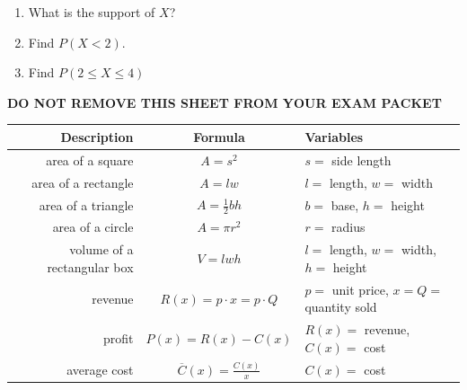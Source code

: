 \documentclass[11pt]{article}
\begin{document}
\begin{enumerate}
\begin{enumerate}
    \item What is the support of $X$?

    \vfill

    \item Find $P(X<2)$.

    \vfill

    \item Find $P(2\le X\le 4)$

    \vfill
\end{enumerate}




\newpage

\begin{center}
{\bf DO NOT REMOVE THIS SHEET FROM YOUR EXAM PACKET}
\end{center}

\begin{center}
    \begin{tabular}{ r | c | l }
    {\bf Description} & {\bf Formula} & {\bf Variables}\\
    \hline
    area of a square & $A=s^2$ & $s=$ side length\\
    \hline
    area of a rectangle & $A=lw$ & $l=$ length, $w=$ width\\
    \hline
    area of a triangle & $A=\frac12bh$ & $b=$ base, $h=$ height\\
    \hline
    area of a circle & $A=\pi r^2$ & $r=$ radius\\
    \hline
    volume of a rectangular box & $V=lwh$ & $l=$ length, $w=$ width, $h=$ height\\
    \hline
    revenue & $R(x) = p\cdot x = p\cdot Q$ & $p=$ unit price, $x=Q=$ quantity sold\\
    \hline
    profit & $P(x) = R(x) - C(x)$ & $R(x)=$ revenue, $C(x)=$ cost\\
    \hline
    average cost & $\overline C(x) = \frac{C(x)}{x}$ & $C(x)=$ cost\\
    \end{tabular}
\end{center}


\end{enumerate}
\end{document}
